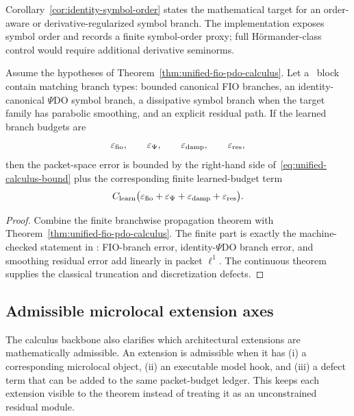 Corollary~\ref{cor:identity-symbol-order} states the mathematical target for an order-aware or derivative-regularized symbol branch.  The implementation exposes symbol order and records a finite symbol-order proxy; full H\"ormander-class control would require additional derivative seminorms.

\begin{corollary}
\label{cor:calculus-backbone-mino}
Assume the hypotheses of Theorem~\ref{thm:unified-fio-pdo-calculus}.  Let a \MiNO\ block contain matching branch types: bounded canonical FIO branches, an identity-canonical $\Psi$DO symbol branch, a dissipative symbol branch when the target family has parabolic smoothing, and an explicit residual path.  If the learned branch budgets are
\[
\varepsilon_{\mathrm{fio}},\qquad
\varepsilon_{\Psi},\qquad
\varepsilon_{\mathrm{damp}},\qquad
\varepsilon_{\mathrm{res}},
\]
then the packet-space error is bounded by the right-hand side of~\eqref{eq:unified-calculus-bound} plus the corresponding finite learned-budget term
\[
C_{\mathrm{learn}}
\bigl(\varepsilon_{\mathrm{fio}}+\varepsilon_{\Psi}+\varepsilon_{\mathrm{damp}}+\varepsilon_{\mathrm{res}}\bigr).
\]
\end{corollary}

\begin{proof}
Combine the finite branchwise propagation theorem with Theorem~\ref{thm:unified-fio-pdo-calculus}.  The finite part is exactly the machine-checked statement in : FIO-branch error, identity-$\Psi$DO branch error, and smoothing residual error add linearly in packet $\ell^1$.  The continuous theorem supplies the classical truncation and discretization defects.
\end{proof}

\subsection{Admissible microlocal extension axes}
\label{sec:admissible-extension-axes}

The calculus backbone also clarifies which architectural extensions are mathematically admissible.  An extension is admissible when it has (i) a corresponding microlocal object, (ii) an executable model hook, and (iii) a defect term that can be added to the same packet-budget ledger.  This keeps each extension visible to the theorem instead of treating it as an unconstrained residual module.

